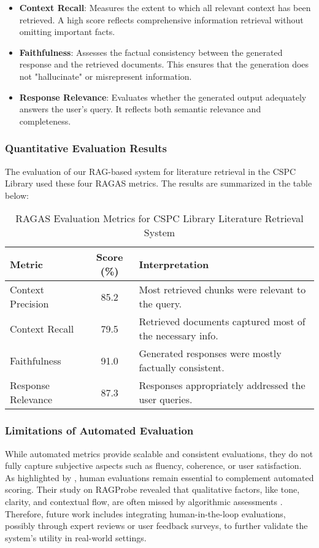 \begin{refsection}
\begin{itemize}
    \item \textbf{Context Recall}: Measures the extent to which all relevant context has been retrieved. A high score reflects comprehensive information retrieval without omitting important facts.

    \item \textbf{Faithfulness}: Assesses the factual consistency between the generated response and the retrieved documents. This ensures that the generation does not "hallucinate" or misrepresent information.

    \item \textbf{Response Relevance}:  Evaluates whether the generated output adequately answers the user’s query. It reflects both semantic relevance and completeness.
\end{itemize}


\subsubsection{Quantitative Evaluation Results}
\hspace{0.4cm}The evaluation of our RAG-based system for literature retrieval in the CSPC Library used these four RAGAS metrics. The results are summarized in the table below:
\begin{table}[H]
\centering
\caption{RAGAS Evaluation Metrics for CSPC Library Literature Retrieval System}
\begin{tabular}{|l|c|p{7cm}|}
\hline
\textbf{Metric} & \textbf{Score (\%)} & \textbf{Interpretation} \\
\hline
Context Precision & 85.2 & Most retrieved chunks were relevant to the query. \\
Context Recall & 79.5 & Retrieved documents captured most of the necessary info. \\
Faithfulness & 91.0 & Generated responses were mostly factually consistent. \\
Response Relevance & 87.3 & Responses appropriately addressed the user queries. \\
\hline
\end{tabular}
\label{tab:raga_eval}
\end{table}


\subsubsection{Limitations of Automated Evaluation}
\hspace{0.4cm}While automated metrics provide scalable and consistent evaluations, they do not fully capture subjective aspects such as fluency, coherence, or user satisfaction. As highlighted by  \citeauthor{sivasothy2024ragprobe}  \citeyear{sivasothy2024ragprobe}, human evaluations remain essential to complement automated scoring. Their study on RAGProbe revealed that qualitative factors, like tone, clarity, and contextual flow, are often missed by algorithmic assessments \cite{sivasothy2024ragprobe}.
Therefore, future work includes integrating human-in-the-loop evaluations, possibly through expert reviews or user feedback surveys, to further validate the system’s utility in real-world settings.


\end{refsection}
